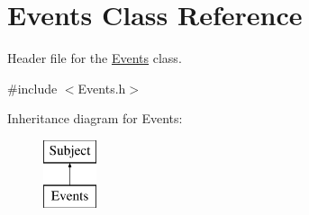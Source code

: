 \hypertarget{class_events}{}\section{Events Class Reference}
\label{class_events}


Header file for the \hyperlink{class_events}{Events} class.  




{\ttfamily \#include $<$Events.\+h$>$}

Inheritance diagram for Events\+:\begin{figure}[H]
\begin{center}
\leavevmode
\includegraphics[height=2.000000cm]{class_events}
\end{center}
\end{figure}
